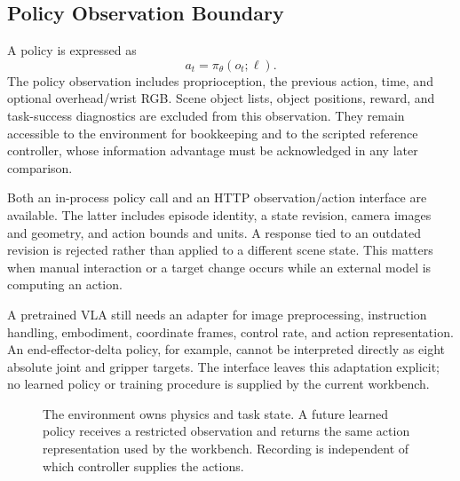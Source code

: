 \documentclass[10pt]{article}
\begin{document}
\subsection{Policy Observation Boundary}
A policy is expressed as
\begin{equation}
 a_t=\pi_{\theta}(o_t;\ell).
\end{equation}
The policy observation includes proprioception, the previous action, time, and optional overhead/wrist RGB. Scene object lists, object positions, reward, and task-success diagnostics are excluded from this observation. They remain accessible to the environment for bookkeeping and to the scripted reference controller, whose information advantage must be acknowledged in any later comparison.



Both an in-process policy call and an HTTP observation/action interface are available. The latter includes episode identity, a state revision, camera images and geometry, and action bounds and units. A response tied to an outdated revision is rejected rather than applied to a different scene state. This matters when manual interaction or a target change occurs while an external model is computing an action.

A pretrained VLA still needs an adapter for image preprocessing, instruction handling, embodiment, coordinate frames, control rate, and action representation. An end-effector-delta policy, for example, cannot be interpreted directly as eight absolute joint and gripper targets. The interface leaves this adaptation explicit; no learned policy or training procedure is supplied by the current workbench.

\begin{figure}[!h]
\centering
{}
\caption{The environment owns physics and task state. A future learned policy receives a restricted observation and returns the same action representation used by the workbench. Recording is independent of which controller supplies the actions.}
\label{fig:architecture}
\end{figure}
\end{document}
